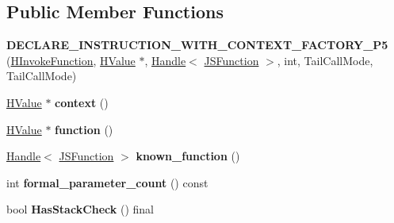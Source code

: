 \subsection*{Public Member Functions}
\begin{DoxyCompactItemize}
\item 
{\bfseries D\+E\+C\+L\+A\+R\+E\+\_\+\+I\+N\+S\+T\+R\+U\+C\+T\+I\+O\+N\+\_\+\+W\+I\+T\+H\+\_\+\+C\+O\+N\+T\+E\+X\+T\+\_\+\+F\+A\+C\+T\+O\+R\+Y\+\_\+\+P5} (\hyperlink{classv8_1_1internal_1_1_h_invoke_function}{H\+Invoke\+Function}, \hyperlink{classv8_1_1internal_1_1_h_value}{H\+Value} $\ast$, \hyperlink{classv8_1_1internal_1_1_handle}{Handle}$<$ \hyperlink{classv8_1_1internal_1_1_j_s_function}{J\+S\+Function} $>$, int, Tail\+Call\+Mode, Tail\+Call\+Mode)\hypertarget{classv8_1_1internal_1_1_h_invoke_function_a9b11ff424178c8b0bbeb463d65c33169}{}\label{classv8_1_1internal_1_1_h_invoke_function_a9b11ff424178c8b0bbeb463d65c33169}

\item 
\hyperlink{classv8_1_1internal_1_1_h_value}{H\+Value} $\ast$ {\bfseries context} ()\hypertarget{classv8_1_1internal_1_1_h_invoke_function_aa8e4ea9c359cfe5d6550cf3dfd3b18d9}{}\label{classv8_1_1internal_1_1_h_invoke_function_aa8e4ea9c359cfe5d6550cf3dfd3b18d9}

\item 
\hyperlink{classv8_1_1internal_1_1_h_value}{H\+Value} $\ast$ {\bfseries function} ()\hypertarget{classv8_1_1internal_1_1_h_invoke_function_a9ebb31ef674306ef2b8a742a8c943b7a}{}\label{classv8_1_1internal_1_1_h_invoke_function_a9ebb31ef674306ef2b8a742a8c943b7a}

\item 
\hyperlink{classv8_1_1internal_1_1_handle}{Handle}$<$ \hyperlink{classv8_1_1internal_1_1_j_s_function}{J\+S\+Function} $>$ {\bfseries known\+\_\+function} ()\hypertarget{classv8_1_1internal_1_1_h_invoke_function_a43b6b8c036a49276431885a62eaaeffb}{}\label{classv8_1_1internal_1_1_h_invoke_function_a43b6b8c036a49276431885a62eaaeffb}

\item 
int {\bfseries formal\+\_\+parameter\+\_\+count} () const \hypertarget{classv8_1_1internal_1_1_h_invoke_function_a84c9d7a22fdfdd6679bf05a290b60572}{}\label{classv8_1_1internal_1_1_h_invoke_function_a84c9d7a22fdfdd6679bf05a290b60572}

\item 
bool {\bfseries Has\+Stack\+Check} () final\hypertarget{classv8_1_1internal_1_1_h_invoke_function_ae974f6f422127ae6e03795f60f439e77}{}\label{classv8_1_1internal_1_1_h_invoke_function_ae974f6f422127ae6e03795f60f439e77}


\end{DoxyCompactItemize}
